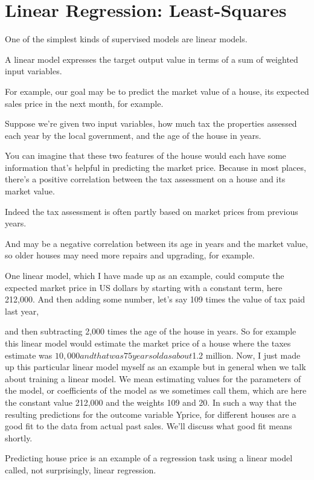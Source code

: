 \section{Linear Regression: Least-Squares}
\begin{multicols}{2}

One of the simplest kinds of supervised models are linear models. 

A linear model expresses the target output value in terms of a sum of weighted input variables. 

For example, our goal may be to predict the market value of a house, its expected sales price in the next month, for example. 

Suppose we're given two input variables, how much tax the properties assessed each year by the local government, and the age of the house in years. 

You can imagine that these two features of the house would each have some information that's helpful in predicting the market price. Because in most places, there's a positive correlation between the tax assessment on a house and its market value. 

Indeed the tax assessment is often partly based on market prices from previous years. 

And may be a negative correlation between its age in years and the market value, so older houses may need more repairs and upgrading, for example. 

One linear model, which I have made up as an example, could compute the expected market price in US dollars by starting with a constant term, here 212,000. And then adding some number, let's say 109 times the value of tax paid last year, 

and then subtracting 2,000 times the age of the house in years. So for example this linear model would estimate the market price of a house where the taxes estimate was $10,000 and that was 75 years old as about $1.2 million. Now, I just made up this particular linear model myself as an example but in general when we talk about training a linear model. We mean estimating values for the parameters of the model, or coefficients of the model as we sometimes call them, which are here the constant value 212,000 and the weights 109 and 20. In such a way that the resulting predictions for the outcome variable Yprice, for different houses are a good fit to the data from actual past sales. We'll discuss what good fit means shortly. 

Predicting house price is an example of a regression task using a linear model called, not surprisingly, linear regression. 


\end{multicols}
